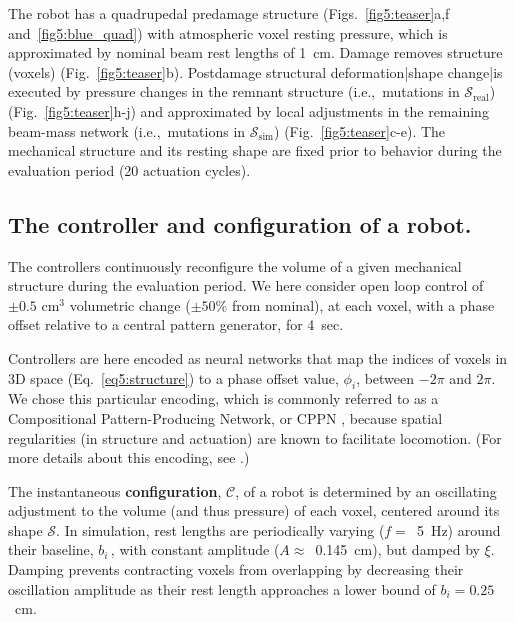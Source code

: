 The robot has a quadrupedal predamage structure (Figs.~\ref{fig5:teaser}a,f and~\ref{fig5:blue_quad}) with atmospheric voxel resting pressure, which is approximated by nominal beam rest lengths of 1~cm.
Damage removes structure (voxels) (Fig.~\ref{fig5:teaser}b).
Postdamage structural deformation|shape change|is executed by pressure changes in the remnant structure (i.e.,~mutations in $\mathcal{S}_{\text{real}}$) \mbox{(Fig.~\ref{fig5:teaser}h-j)} and approximated by local adjustments in the remaining beam-mass network (i.e.,~mutations in $\mathcal{S}_{\text{sim}}$) (Fig.~\ref{fig5:teaser}c-e).
The mechanical structure and its resting shape are fixed prior to behavior during the evaluation period (20 actuation cycles).


\subsection*{The controller and configuration of a robot.}
\label{sec5:methods:controller}


The controllers continuously reconfigure the volume of a given mechanical structure during the evaluation period.
We here consider open loop control of 
$\pm0.5$ cm$^3$ volumetric change ($\pm50\%$ from nominal),
at each voxel, with a phase offset relative to a central pattern generator, for 4~sec.

Controllers are here encoded as neural networks that map the indices of voxels in 3D space (Eq.~\ref{eq5:structure}) to a phase offset value, $\phi_i$, between $-2\pi$ and $2\pi$.
We chose this particular encoding, which is commonly referred to as a Compositional Pattern-Producing Network, or CPPN \cite{stanley2007compositional},
because spatial regularities (in structure and actuation) are known to facilitate locomotion.
(For more details about this encoding, see \cite{cheney2013unshackling}.)


The instantaneous \textbf{configuration}, 
$\mathcal{C}$,
of a robot is determined by an oscillating adjustment to the volume (and thus pressure) of each voxel,
centered around its shape $\mathcal{S}$.
In simulation, rest lengths are
periodically varying \mbox{($f=$ 5~Hz)} around their baseline, $b_i\,$,
with constant amplitude
\mbox{($A\approx$~0.145~cm)}, but damped by $\xi$.
Damping prevents contracting voxels from overlapping by decreasing their oscillation amplitude as their rest length approaches a lower bound of $b_i=0.25$~cm.

